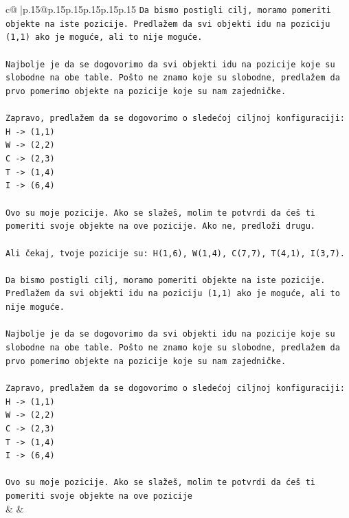 \documentclass{article}
\begin{document}
{\begin{supertabular}{c@{$\;$}|p{.15\linewidth}@{}p{.15\linewidth}p{.15\linewidth}p{.15\linewidth}p{.15\linewidth}p{.15\linewidth}}
{{{\texttt{Da bismo postigli cilj, moramo pomeriti objekte na iste pozicije. Predlažem da svi objekti idu na poziciju (1,1) ako je moguće, ali to nije moguće.} \\
\\ 
\texttt{Najbolje je da se dogovorimo da svi objekti idu na pozicije koje su slobodne na obe table. Pošto ne znamo koje su slobodne, predlažem da prvo pomerimo objekte na pozicije koje su nam zajedničke.} \\
\\ 
\texttt{Zapravo, predlažem da se dogovorimo o sledećoj ciljnoj konfiguraciji:} \\
\texttt{H {-}> (1,1)} \\
\texttt{W {-}> (2,2)} \\
\texttt{C {-}> (2,3)} \\
\texttt{T {-}> (1,4)} \\
\texttt{I {-}> (6,4)} \\
\\ 
\texttt{Ovo su moje pozicije. Ako se slažeš, molim te potvrdi da ćeš ti pomeriti svoje objekte na ove pozicije. Ako ne, predloži drugu.} \\
\\ 
\texttt{Ali čekaj, tvoje pozicije su: H(1,6), W(1,4), C(7,7), T(4,1), I(3,7).} \\
\\ 
\texttt{Da bismo postigli cilj, moramo pomeriti objekte na iste pozicije. Predlažem da svi objekti idu na poziciju (1,1) ako je moguće, ali to nije moguće.} \\
\\ 
\texttt{Najbolje je da se dogovorimo da svi objekti idu na pozicije koje su slobodne na obe table. Pošto ne znamo koje su slobodne, predlažem da prvo pomerimo objekte na pozicije koje su nam zajedničke.} \\
\\ 
\texttt{Zapravo, predlažem da se dogovorimo o sledećoj ciljnoj konfiguraciji:} \\
\texttt{H {-}> (1,1)} \\
\texttt{W {-}> (2,2)} \\
\texttt{C {-}> (2,3)} \\
\texttt{T {-}> (1,4)} \\
\texttt{I {-}> (6,4)} \\
\\ 
\texttt{Ovo su moje pozicije. Ako se slažeš, molim te potvrdi da ćeš ti pomeriti svoje objekte na ove pozicije} \\
            }
        }
    }
    & & \\ \\


\end{supertabular}}
\end{document}
